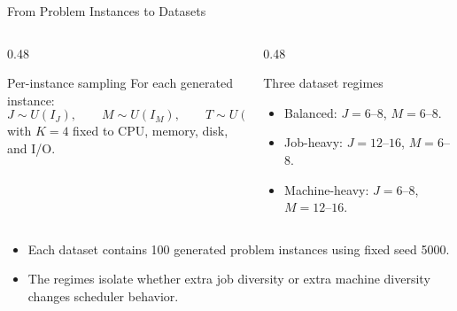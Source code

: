 \documentclass[aspectratio=169,10pt]{beamer}
\begin{document}
\begin{frame}{From Problem Instances to Datasets}
  \begin{columns}[T,totalwidth=\textwidth]
    \begin{column}{0.48\textwidth}
      \begin{block}{Per-instance sampling}
        For each generated instance:
        \[
          J\sim U(I_J),\qquad
          M\sim U(I_M),\qquad
          T\sim U(I_T)
        \]
        with $K=4$ fixed to CPU, memory, disk, and I/O.
      \end{block}
    \end{column}
    \begin{column}{0.48\textwidth}
      \begin{block}{Three dataset regimes}
        \begin{itemize}
          \item Balanced: $J=6$--$8$, $M=6$--$8$.
          \item Job-heavy: $J=12$--$16$, $M=6$--$8$.
          \item Machine-heavy: $J=6$--$8$, $M=12$--$16$.
        \end{itemize}
      \end{block}
    \end{column}
  \end{columns}
  \vspace{0.15cm}
  \begin{itemize}
    \item Each dataset contains 100 generated problem instances using fixed seed 5000.
    \item The regimes isolate whether extra job diversity or extra machine diversity changes scheduler behavior.
  \end{itemize}
\end{frame}
\end{document}
